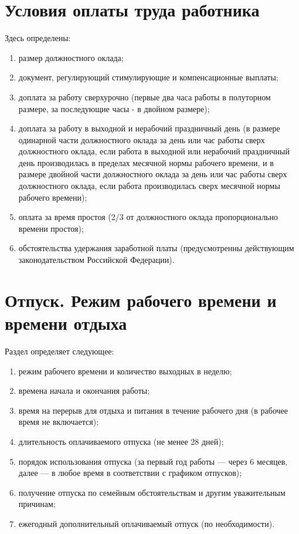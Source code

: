 \documentclass[a4paper]{article}
\begin{document}
	\section{Условия оплаты труда работника}
		Здесь определены:
		\begin{enumerate}
			\item размер должностного оклада;
			
			\item документ, регулирующий стимулирующие и компенсационные выплаты;
			
			\item доплата за работу сверхурочно (первые два часа работы в полуторном размере, за последующие часы - в двойном размере);
			
			\item доплата за работу в выходной и нерабочий праздничный день (в размере одинарной части должностного оклада за день или час работы сверх должностного оклада, если работа в выходной или нерабочий праздничный день производилась в пределах месячной нормы рабочего времени, и в размере двойной части должностного оклада за день или час работы сверх должностного оклада, если работа производилась сверх месячной нормы рабочего времени);
			
			\item оплата за время простоя (2/3 от должностного оклада пропорционально времени простоя);
			
			\item обстоятельства удержания заработной платы (предусмотренны действующим законодательством Российской Федерации).
		\end{enumerate}
	\section{Отпуск. Режим рабочего времени и времени отдыха}
		Раздел определяет следующее:
		\begin{enumerate}
			\item режим рабочего времени и количество выходных в неделю;
			
			\item времена начала и окончания работы;
			
			\item время на перерыв для отдыха и питания в течение рабочего дня (в рабочее время не включается);
			
			\item длительность оплачиваемого отпуска (не менее 28 дней);
			
			\item порядок использования отпуска (за первый год работы --- через 6 месяцев, далее --- в любое время в соответствии с графиком отпусков);
			
			\item получение отпуска по семейным обстоятельствам и другим уважительным причинам;
			
			\item ежегодный дополнительный оплачиваемый отпуск (по необходимости).
		\end{enumerate}
\end{document}
